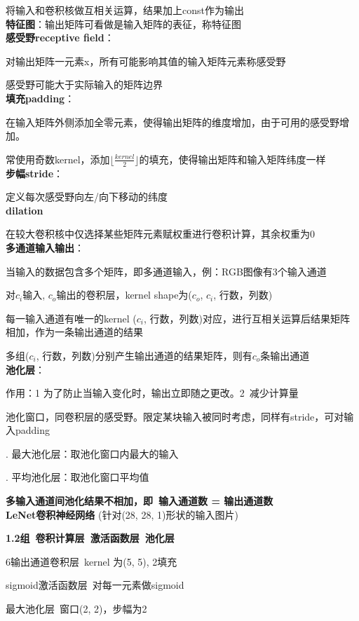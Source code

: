 \documentclass[UTF8]{ctexart}
\begin{document}
  将输入和卷积核做互相关运算，结果加上const作为输出\\
\textbf{特征图}：输出矩阵可看做是输入矩阵的表征，称特征图\\
\textbf{感受野receptive field}：
  
  对输出矩阵一元素x，所有可能影响其值的输入矩阵元素称感受野

  感受野可能大于实际输入的矩阵边界\\
\textbf{填充padding}：
  
  在输入矩阵外侧添加全零元素，使得输出矩阵的维度增加，由于可用的感受野增加。

  常使用奇数kernel，添加$\lfloor \frac{kernel}{2}\rfloor $的填充，使得输出矩阵和输入矩阵纬度一样\\
\textbf{步幅stride}：

  定义每次感受野向左/向下移动的纬度\\
\textbf{dilation}

  在较大卷积核中仅选择某些矩阵元素赋权重进行卷积计算，其余权重为0\\
\textbf{多通道输入输出}：

  当输入的数据包含多个矩阵，即多通道输入，例：RGB图像有3个输入通道

  对$c_i$输入, $c_o$输出的卷积层，kernel shape为($c_o$, $c_i$, 行数，列数)

  \quad 每一输入通道有唯一的kernel ($c_i$, 行数，列数)对应，进行互相关运算后结果矩阵相加，作为一条输出通道的结果

  \quad 多组($c_i$, 行数，列数)分别产生输出通道的结果矩阵，则有$c_o$条输出通道\\
\textbf{池化层}：
  
  作用：1 为了防止当输入变化时，输出立即随之更改。2\ 减少计算量

  池化窗口，同卷积层的感受野。限定某块输入被同时考虑，同样有stride，可对输入padding

  . 最大池化层：取池化窗口内最大的输入

  . 平均池化层：取池化窗口平均值

  \textbf{多输入通道间池化结果不相加，即\ 输入通道数 = 输出通道数}\\
\textbf{LeNet卷积神经网络} (针对(28, 28, 1)形状的输入图片)

  \textbf{1.2组\ 卷积计算层\ 激活函数层\ 池化层}

  \quad 6输出通道卷积层\ kernel 为(5, 5), 2填充

  \quad sigmoid激活函数层\ 对每一元素做sigmoid

  \quad 最大池化层\ 窗口(2, 2)，步幅为2
\end{document}
